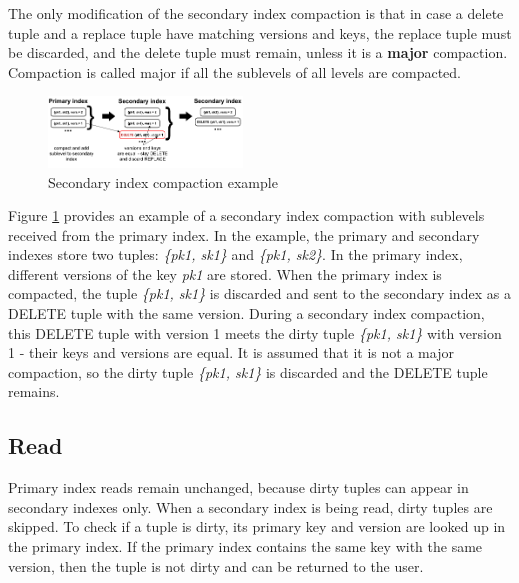 \documentclass{vldb}
\begin{document}
The only modification of the secondary index compaction is that in case 
a delete tuple and a replace tuple have matching versions and keys, the replace
tuple must be discarded, and the delete tuple must remain, unless it is a \textbf{major}
compaction. Compaction is called major if all the sublevels of all levels are compacted.
\begin{figure}
\centering
\includegraphics[width=0.46\textwidth]{secondary_compaction_example}
\caption{Secondary index compaction example}
\label{fig:secondary_compaction_example}
\end{figure}
Figure \ref{fig:secondary_compaction_example} provides an example of
a secondary index compaction with sublevels received from the primary index.
In the example, the primary and secondary indexes store two tuples:
\textit{\{pk1, sk1\}} and \textit{\{pk1, sk2\}}. In the primary index, different
versions of the key \textit{pk1} are stored. When the primary index is compacted,
the tuple \textit{\{pk1, sk1\}} is discarded and sent to the secondary index as a
DELETE tuple with the same version. During a secondary index compaction, this
DELETE tuple with version 1 meets the dirty tuple \textit{\{pk1, sk1\}} with
version 1 - their keys and versions are equal. It is assumed that it is not a major
compaction, so the dirty tuple \textit{\{pk1, sk1\}} is discarded and the DELETE
tuple remains.

\subsection{Read}

Primary index reads remain unchanged, because dirty tuples can appear in
secondary indexes only. When a secondary index is being read, dirty tuples are
skipped. To check if a tuple is dirty, its primary key and version are looked
up in the primary index. If the primary index contains the same key with the same
version, then the tuple is not dirty and can be returned to the user.
\end{document}
